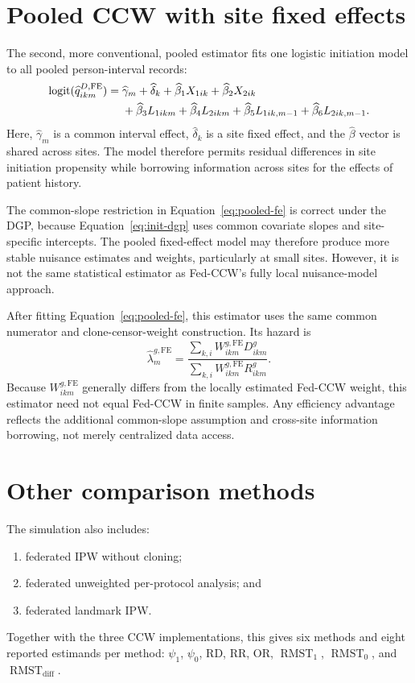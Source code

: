 \documentclass[11pt]{article}
\newcommand{\RMST}{\operatorname{RMST}}
\begin{document}
\section{Pooled CCW with site fixed effects}

The second, more conventional, pooled estimator fits one logistic initiation model to all pooled
person-interval records:
\begin{align}
\label{eq:pooled-fe}
  \operatorname{logit}(\widehat q^{D,\mathrm{FE}}_{ikm})
  ={}&\widehat\gamma_m+\widehat\delta_k
      +\widehat\beta_1X_{1ik}+\widehat\beta_2X_{2ik} \notag\\
     &+\widehat\beta_3L_{1ikm}+\widehat\beta_4L_{2ikm}
      +\widehat\beta_5L_{1ik,m-1}
      +\widehat\beta_6L_{2ik,m-1}.
\end{align}
Here, $\widehat\gamma_m$ is a common interval effect,
$\widehat\delta_k$ is a site fixed effect, and the $\widehat\beta$ vector is
shared across sites. The model therefore permits residual differences in site
initiation propensity while borrowing information across sites for the
effects of patient history.

The common-slope restriction in Equation~\eqref{eq:pooled-fe} is correct under
the DGP, because Equation~\eqref{eq:init-dgp} uses common covariate
slopes and site-specific intercepts. The pooled fixed-effect model may
therefore produce more stable nuisance estimates and weights, particularly at
small sites. However, it is not the same statistical estimator as Fed-CCW's
fully local nuisance-model approach.

After fitting Equation~\eqref{eq:pooled-fe}, this estimator uses the same
common numerator and clone-censor-weight construction. Its hazard is
\[
  \widehat\lambda_m^{g,\mathrm{FE}}
  =\frac{\sum_{k,i}W^{g,\mathrm{FE}}_{ikm}D^g_{ikm}}
         {\sum_{k,i}W^{g,\mathrm{FE}}_{ikm}R^g_{ikm}}.
\]
Because $W^{g,\mathrm{FE}}_{ikm}$ generally differs from the locally estimated
Fed-CCW weight, this estimator need not equal Fed-CCW in finite samples. Any
efficiency advantage reflects the additional common-slope assumption and
cross-site information borrowing, not merely centralized data access.

\section{Other comparison methods}

The simulation also includes:
\begin{enumerate}[leftmargin=2em]
  \item federated IPW without cloning;
  \item federated unweighted per-protocol analysis; and
  \item federated landmark IPW.
\end{enumerate}
Together with the three CCW implementations, this gives six methods and eight
reported estimands per method: $\psi_1$, $\psi_0$, RD, RR, OR, $\RMST_1$,
$\RMST_0$, and $\RMST_{\mathrm{diff}}$.
\end{document}
